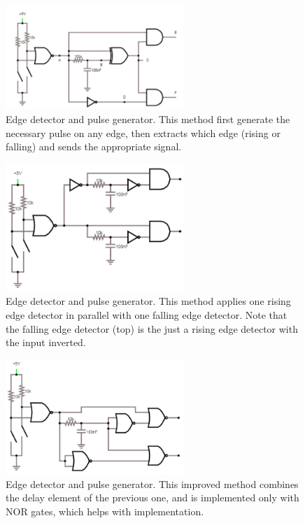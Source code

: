 \documentclass{article}
\begin{document}
		\begin{figure}
			\centering
			\includegraphics[width = 0.6\textwidth]{PR2Images/BidirectionalEdgeSchem.PNG}
			\caption{Edge detector and pulse generator.  This method first generate the necessary pulse on any edge, then extracts which edge (rising or falling) and sends the appropriate signal.}
			\label{fig:BidirectionalEdgeScheme}
		\end{figure}

		\begin{figure}
			\centering
			\includegraphics[width = 0.6\textwidth]{PR2Images/ParallelEdgeSchem.PNG}
			\caption{Edge detector and pulse generator.  This method applies one rising edge detector in parallel with one falling edge detector.  Note that the falling edge detector (top) is the just a rising edge detector with the input inverted.}
			\label{fig:RisingFallingParallel}
		\end{figure}

		\begin{figure}
			\centering
			\includegraphics[width = 0.6\textwidth]{PR2Images/NOREdgeSchem.PNG}
			\caption{Edge detector and pulse generator.  This improved method combines the delay element of the previous one, and is implemented only with NOR gates, which helps with implementation.}
			\label{fig:ImprovedEdge}
		\end{figure}
\end{document}
